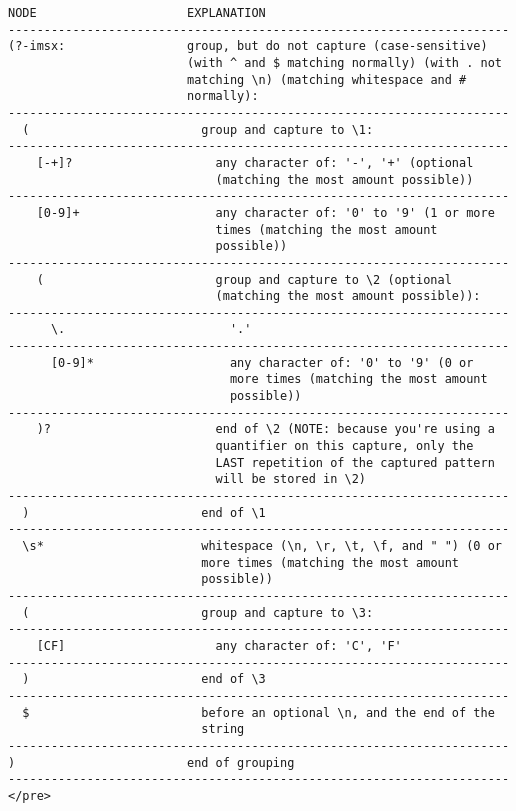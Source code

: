 \begin{verbatim}
NODE                     EXPLANATION
----------------------------------------------------------------------
(?-imsx:                 group, but do not capture (case-sensitive)
                         (with ^ and $ matching normally) (with . not
                         matching \n) (matching whitespace and #
                         normally):
----------------------------------------------------------------------
  (                        group and capture to \1:
----------------------------------------------------------------------
    [-+]?                    any character of: '-', '+' (optional
                             (matching the most amount possible))
----------------------------------------------------------------------
    [0-9]+                   any character of: '0' to '9' (1 or more
                             times (matching the most amount
                             possible))
----------------------------------------------------------------------
    (                        group and capture to \2 (optional
                             (matching the most amount possible)):
----------------------------------------------------------------------
      \.                       '.'
----------------------------------------------------------------------
      [0-9]*                   any character of: '0' to '9' (0 or
                               more times (matching the most amount
                               possible))
----------------------------------------------------------------------
    )?                       end of \2 (NOTE: because you're using a
                             quantifier on this capture, only the
                             LAST repetition of the captured pattern
                             will be stored in \2)
----------------------------------------------------------------------
  )                        end of \1
----------------------------------------------------------------------
  \s*                      whitespace (\n, \r, \t, \f, and " ") (0 or
                           more times (matching the most amount
                           possible))
----------------------------------------------------------------------
  (                        group and capture to \3:
----------------------------------------------------------------------
    [CF]                     any character of: 'C', 'F'
----------------------------------------------------------------------
  )                        end of \3
----------------------------------------------------------------------
  $                        before an optional \n, and the end of the
                           string
----------------------------------------------------------------------
)                        end of grouping
----------------------------------------------------------------------
</pre>
\end{verbatim}


